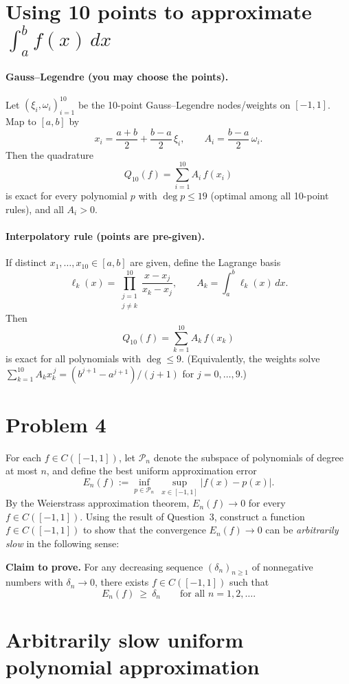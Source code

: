 \documentclass[11pt,a4paper]{article}
\theoremstyle{definition}
\theoremstyle{definition}
\theoremstyle{plain}
\theoremstyle{remark}
\begin{document}
\section*{Using 10 points to approximate \(\int_a^b f(x)\,dx\)}

\paragraph{Gauss--Legendre (you may choose the points).}
Let \((\xi_i,\omega_i)_{i=1}^{10}\) be the 10-point Gauss–Legendre nodes/weights on \([-1,1]\).
Map to \([a,b]\) by
\[
x_i=\frac{a+b}{2}+\frac{b-a}{2}\,\xi_i,\qquad
A_i=\frac{b-a}{2}\,\omega_i.
\]
Then the quadrature
\[
Q_{10}(f)=\sum_{i=1}^{10} A_i\,f(x_i)
\]
is exact for every polynomial \(p\) with \(\deg p\le 19\) (optimal among all 10-point rules),
and all \(A_i>0\).

\paragraph{Interpolatory rule (points are pre-given).}
If distinct \(x_1,\dots,x_{10}\in[a,b]\) are given, define the Lagrange basis
\[
\ell_k(x)=\prod_{\substack{j=1\\ j\ne k}}^{10}\frac{x-x_j}{x_k-x_j},
\qquad
A_k=\int_a^b \ell_k(x)\,dx.
\]
Then
\[
Q_{10}(f)=\sum_{k=1}^{10} A_k\,f(x_k)
\]
is exact for all polynomials with \(\deg\le 9\).
(Equivalently, the weights solve \(\sum_{k=1}^{10} A_k x_k^{\,j}=(b^{j+1}-a^{j+1})/(j+1)\) for \(j=0,\dots,9\).)

\section*{Problem 4}
For each \(f\in C([-1,1])\), let \(\mathcal P_n\) denote the subspace of polynomials of degree
at most \(n\), and define the best uniform approximation error
\[
E_n(f):=\inf_{p\in \mathcal P_n}\ \sup_{x\in[-1,1]} |f(x)-p(x)|.
\]
By the Weierstrass approximation theorem, \(E_n(f)\to 0\) for every \(f\in C([-1,1])\).
Using the result of Question~3, construct a function \(f\in C([-1,1])\) to show that the
convergence \(E_n(f)\to 0\) can be \emph{arbitrarily slow} in the following sense:

\medskip
\noindent
\textbf{Claim to prove.} For any decreasing sequence \((\delta_n)_{n\ge1}\) of nonnegative numbers with
\(\delta_n\to 0\), there exists \(f\in C([-1,1])\) such that
\[
E_n(f)\ \ge\ \delta_n \qquad\text{for all } n=1,2,\dots.
\]

\section*{Arbitrarily slow uniform polynomial approximation}
\end{document}
